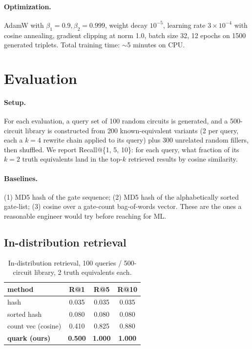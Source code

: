 \documentclass[11pt]{article}
\begin{document}
\paragraph{Optimization.} AdamW with $\beta_1 = 0.9, \beta_2 = 0.999$, weight decay $10^{-5}$, learning rate $3 \times 10^{-4}$ with cosine annealing, gradient clipping at norm 1.0, batch size 32, 12 epochs on 1500 generated triplets. Total training time: $\sim$5 minutes on CPU.

\section{Evaluation}

\paragraph{Setup.} For each evaluation, a query set of 100 random circuits is generated, and a 500-circuit library is constructed from 200 known-equivalent variants (2 per query, each a $k=4$ rewrite chain applied to its query) plus 300 unrelated random fillers, then shuffled. We report Recall@\{1, 5, 10\}: for each query, what fraction of its $k=2$ truth equivalents land in the top-$k$ retrieved results by cosine similarity.

\paragraph{Baselines.} (1) MD5 hash of the gate sequence; (2) MD5 hash of the alphabetically sorted gate-list; (3) cosine over a gate-count bag-of-words vector. These are the ones a reasonable engineer would try before reaching for ML.

\subsection{In-distribution retrieval}

\begin{table}[h]
\centering
\begin{tabular}{lccc}
\toprule
method & R@1 & R@5 & R@10 \\
\midrule
hash & 0.035 & 0.035 & 0.035 \\
sorted hash & 0.080 & 0.080 & 0.080 \\
count vec (cosine) & 0.410 & 0.825 & 0.880 \\
\textbf{quark (ours)} & \textbf{0.500} & \textbf{1.000} & \textbf{1.000} \\
\bottomrule
\end{tabular}
\caption{In-distribution retrieval, 100 queries / 500-circuit library, 2 truth equivalents each.}
\end{table}
\end{document}
